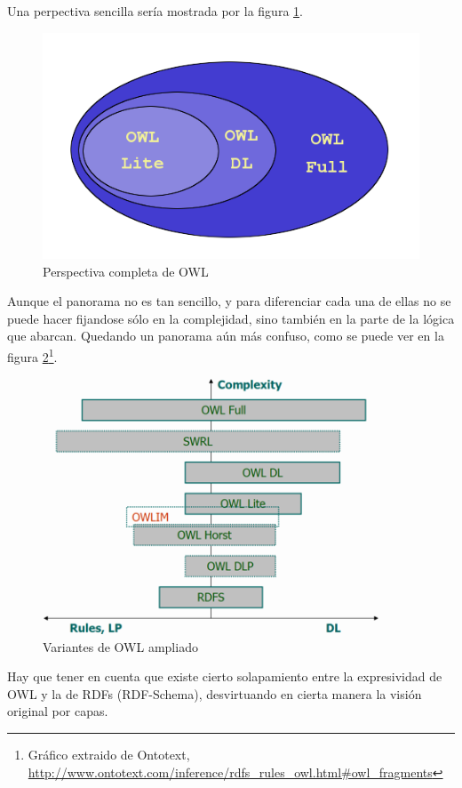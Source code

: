 Una perpectiva sencilla sería mostrada por la figura \ref{fig:owlVariants}.

\begin{figure}[H]
	\centering
	\includegraphics[width=12cm]{images/owl-variants.png}
	\caption{Perspectiva completa de OWL}
	\label{fig:owlVariants}
\end{figure}

Aunque el panorama no es tan sencillo, y para diferenciar cada una de ellas no
se puede hacer fijandose sólo en la complejidad, sino también en la parte de la 
lógica que abarcan. Quedando un panorama aún más confuso, como se puede ver en 
la figura \ref{fig:owlVariantsExtended}\footnote{Gráfico extraido de Ontotext, 
\url{http://www.ontotext.com/inference/rdfs_rules_owl.html#owl_fragments}}.

\begin{figure}[H]
	\centering
	\includegraphics[width=10cm]{images/owl-dialects.png}
	\caption{Variantes de OWL ampliado}
	\label{fig:owlVariantsExtended}
\end{figure}

Hay que tener en cuenta que existe cierto solapamiento entre la expresividad de
OWL y la de RDFs (RDF-Schema), desvirtuando en cierta manera la visión original
por capas.

